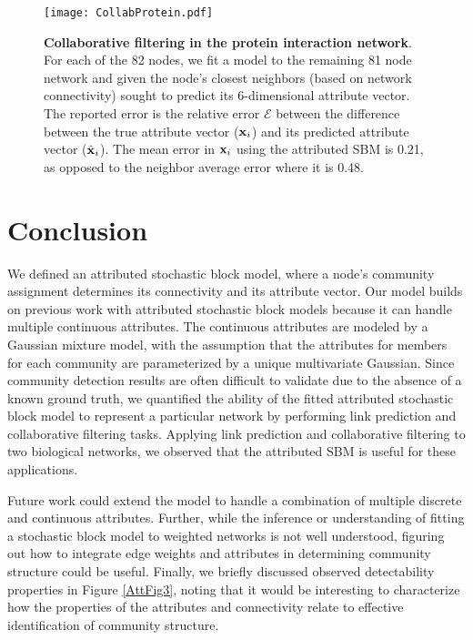 \begin{figure}[h!]
\begin{center}
\texttt{[image: CollabProtein.pdf]}
\caption{{\bf Collaborative filtering in the protein interaction network}. For each of the 82 nodes, we fit a model to the remaining 81 node network and given the node's closest  neighbors (based on network connectivity) sought to predict its 6-dimensional attribute vector. The reported error is the relative error $\mathcal{E}$ between the difference between the true attribute vector (${\bf x}_{i}$) and its predicted attribute vector (${\hat{\bf x}}_{i}$). The mean error in ${\bf x}_{i}$ using the attributed SBM is 0.21, as opposed to the neighbor average error where it is 0.48. }
\label{collabprotein}
\end{center}
\end{figure}

\section{Conclusion}
We defined an attributed stochastic block model, where a node's community assignment determines its connectivity and its attribute vector. Our model builds on previous work with attributed stochastic block models because it can handle multiple continuous attributes. The continuous attributes are modeled by a Gaussian mixture model, with the assumption that the attributes for members for each community are parameterized by a unique multivariate Gaussian. Since community detection results are often difficult to validate due to the absence of a known ground truth, we quantified the ability of the fitted attributed stochastic block model to represent a particular network by performing link prediction and collaborative filtering tasks. Applying link prediction and collaborative filtering to two biological networks, we observed that the attributed SBM is useful for these applications.

Future work could extend the model to handle a combination of multiple discrete and continuous attributes. Further, while the inference or understanding of fitting a stochastic block model to weighted networks is not well understood, figuring out how to integrate edge weights and attributes in determining community structure could be useful. Finally, we briefly discussed observed detectability properties in Figure \ref{AttFig3}, noting that it would be interesting to characterize how the properties of the attributes and connectivity relate to effective identification of community structure.

